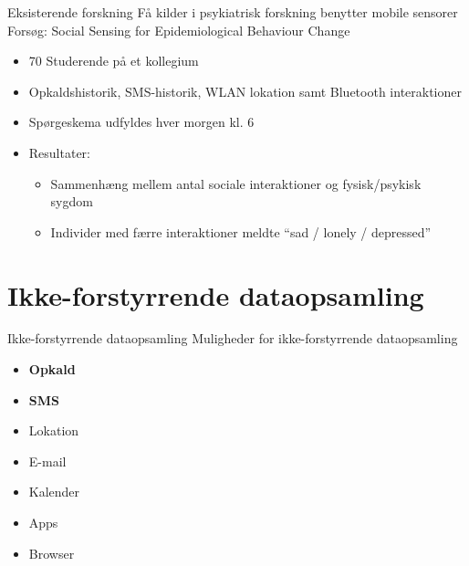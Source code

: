 { %
	\begin{frame}{Eksisterende forskning} %
		Få kilder i psykiatrisk forskning benytter mobile sensorer\\
		
		Forsøg: Social Sensing for Epidemiological Behaviour Change
		\begin{itemize}
			\item 70 Studerende på et kollegium
			\item Opkaldshistorik, SMS-historik, WLAN lokation samt Bluetooth interaktioner
			\item Spørgeskema udfyldes hver morgen kl. 6
			\item Resultater:
			\begin{itemize}
				\item Sammenhæng mellem antal sociale interaktioner og fysisk/psykisk sygdom
				\item Individer med færre interaktioner meldte ``sad / lonely / depressed''
			\end{itemize}
		\end{itemize}
		
		
	\end{frame}}

\section{Ikke-forstyrrende dataopsamling}
{ %
	\begin{frame}{Ikke-forstyrrende dataopsamling} %
		Muligheder for ikke-forstyrrende dataopsamling
		\begin{itemize}
			\item \textbf{Opkald}
			\item \textbf{SMS}
			\item Lokation
			\item E-mail
			\item Kalender
			\item Apps
			\item Browser
		\end{itemize}
			
	\end{frame}}




